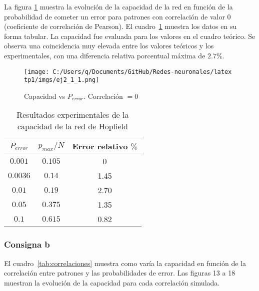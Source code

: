 \documentclass[11pt]{article} %
\begin{document}
La figura \ref{fig:ej2_1_1} muestra la evolución de la capacidad de la red en función de la probabilidad de cometer un error para patrones con correlación de valor $0$ (coeficiente de correlación de Pearson). El cuadro~\ref{tab:2} muestra los datos en su forma tabular. La capacidad fue evaluada para los valores en el cuadro teórico. Se observa una coincidencia muy elevada entre los valores teóricos y los experimentales, con una diferencia relativa porcentual máxima de $2.7\%$. 


\begin{figure}[h!]
    \centering
    \texttt{[image: C:/Users/q/Documents/GitHub/Redes-neuronales/latex tp1/imgs/ej2\_1\_1.png]}
    \caption{Capacidad vs $P_{error}$. Correlación $= 0$}
    \label{fig:ej2_1_1}
\end{figure}

\begin{table}[h!]
\centering
\begin{tabular}{|c|c|c|}
\hline
$P_{error}$ & $p_{max}/N$ &Error relativo $\%$\\ \hline
$0.001$     & $0.105$ & 0   \\ \hline
$0.0036$    & $0.14$   &  1.45\\ \hline
$0.01$      & $0.19$   &  2.70\\ \hline
$0.05$      & $0.375$ &   1.35  \\ \hline
$0.1$       & $0.615$    & 0.82 \\ \hline
\end{tabular}
\caption{Resultados experimentales de la capacidad de la red de Hopfield}
\label{tab:2}
\end{table}

\newpage

\subsubsection{Consigna b}

El cuadro~\ref{tab:correlaciones} muestra como varía la capacidad en función de la correlación entre patrones y las probabilidades de error. Las figuras 13 a 18 muestran la evolución de la capacidad para cada correlación simulada. 
\end{document}

